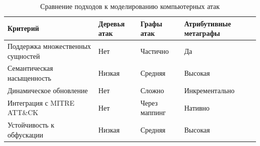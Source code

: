 \documentclass[tikz, border=2mm]{standalone}
\begin{document}
\usepackage{tabularx}

\begin{table}[ht]
\centering
\caption{Сравнение подходов к моделированию компьютерных атак}
\label{tab:model_comparison}
\begin{tabularx}{\linewidth}{@{}>{\hsize=0.25\hsize}X
                          >{\hsize=0.25\hsize}X
                          >{\hsize=0.25\hsize}X
                          >{\hsize=0.25\hsize}X@{}}
\toprule
\textbf{Критерий} & \textbf{Деревья атак} & \textbf{Графы атак} & \textbf{Атрибутивные метаграфы} \\
\midrule
Поддержка множественных сущностей & Нет & Частично & Да \\
Семантическая насыщенность & Низкая & Средняя & Высокая \\
Динамическое обновление & Нет & Сложно & Инкрементально \\
Интеграция с MITRE ATT\&CK & Нет & Через маппинг & Нативно \\
Устойчивость к обфускации & Низкая & Средняя & Высокая \\
\bottomrule
\end{tabularx}
\end{table}
\end{document}
